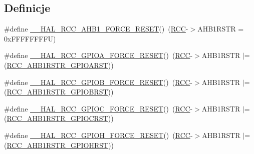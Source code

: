 \subsection*{Definicje}
\begin{DoxyCompactItemize}
\item 
\#define \hyperlink{group___r_c_c___a_h_b1___force___release___reset_ga87d828d91e67aaa931853a60779826c2}{\+\_\+\+\_\+\+H\+A\+L\+\_\+\+R\+C\+C\+\_\+\+A\+H\+B1\+\_\+\+F\+O\+R\+C\+E\+\_\+\+R\+E\+S\+ET}()~(\hyperlink{group___peripheral__declaration_ga74944438a086975793d26ae48d5882d4}{R\+CC}-\/$>$A\+H\+B1\+R\+S\+TR = 0x\+F\+F\+F\+F\+F\+F\+F\+F\+U)
\item 
\#define \hyperlink{group___r_c_c___a_h_b1___force___release___reset_gab329bd497cccffd979bcca9fd42bbc79}{\+\_\+\+\_\+\+H\+A\+L\+\_\+\+R\+C\+C\+\_\+\+G\+P\+I\+O\+A\+\_\+\+F\+O\+R\+C\+E\+\_\+\+R\+E\+S\+ET}()~(\hyperlink{group___peripheral__declaration_ga74944438a086975793d26ae48d5882d4}{R\+CC}-\/$>$A\+H\+B1\+R\+S\+TR $\vert$= (\hyperlink{group___peripheral___registers___bits___definition_ga6c171937e46c2b9a58f16ee82010509e}{R\+C\+C\+\_\+\+A\+H\+B1\+R\+S\+T\+R\+\_\+\+G\+P\+I\+O\+A\+R\+ST}))
\item 
\#define \hyperlink{group___r_c_c___a_h_b1___force___release___reset_ga3b89be9638638ffce3ebd4f08a3b64cf}{\+\_\+\+\_\+\+H\+A\+L\+\_\+\+R\+C\+C\+\_\+\+G\+P\+I\+O\+B\+\_\+\+F\+O\+R\+C\+E\+\_\+\+R\+E\+S\+ET}()~(\hyperlink{group___peripheral__declaration_ga74944438a086975793d26ae48d5882d4}{R\+CC}-\/$>$A\+H\+B1\+R\+S\+TR $\vert$= (\hyperlink{group___peripheral___registers___bits___definition_ga8e60d32cb67768339fc47a2ba11b7a97}{R\+C\+C\+\_\+\+A\+H\+B1\+R\+S\+T\+R\+\_\+\+G\+P\+I\+O\+B\+R\+ST}))
\item 
\#define \hyperlink{group___r_c_c___a_h_b1___force___release___reset_ga6e6a20fa8e0d7b3ebfdce26f6b1a1ed0}{\+\_\+\+\_\+\+H\+A\+L\+\_\+\+R\+C\+C\+\_\+\+G\+P\+I\+O\+C\+\_\+\+F\+O\+R\+C\+E\+\_\+\+R\+E\+S\+ET}()~(\hyperlink{group___peripheral__declaration_ga74944438a086975793d26ae48d5882d4}{R\+CC}-\/$>$A\+H\+B1\+R\+S\+TR $\vert$= (\hyperlink{group___peripheral___registers___bits___definition_ga8d02a09e1dafda744c7b27dca99fa3ef}{R\+C\+C\+\_\+\+A\+H\+B1\+R\+S\+T\+R\+\_\+\+G\+P\+I\+O\+C\+R\+ST}))
\item 
\#define \hyperlink{group___r_c_c___a_h_b1___force___release___reset_ga4f05c575d762edf40a6d17f88671b68d}{\+\_\+\+\_\+\+H\+A\+L\+\_\+\+R\+C\+C\+\_\+\+G\+P\+I\+O\+H\+\_\+\+F\+O\+R\+C\+E\+\_\+\+R\+E\+S\+ET}()~(\hyperlink{group___peripheral__declaration_ga74944438a086975793d26ae48d5882d4}{R\+CC}-\/$>$A\+H\+B1\+R\+S\+TR $\vert$= (\hyperlink{group___peripheral___registers___bits___definition_ga587e3e32701cbd127d2afb19b9bff5fd}{R\+C\+C\+\_\+\+A\+H\+B1\+R\+S\+T\+R\+\_\+\+G\+P\+I\+O\+H\+R\+ST}))

\end{DoxyCompactItemize}
